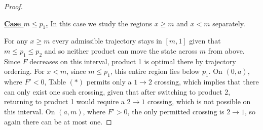 \documentclass[11pt]{article}
\begin{document}
\begin{proof}
\begin{figure}[H]
\centering
{}
\label{fig:middle-interval-policy}
\end{figure}

\medskip\noindent\underline{\textbf{\boldmath Case $m\le p_1$.}}
In this case we study the regions $x\ge m$ and $x<m$ separately.


For any $x\ge m$ every admissible trajectory stays in $[m,1]$ given that $m\le p_1\le p_2$ and so neither product can move the state across $m$ from above. Since $F$ decreases on this interval, product 1 is optimal there by trajectory ordering.
For $x<m$, since $m\le p_1$, this entire region lies below $p_1$. On $(0,a)$, where $F'<0$, Table $(*)$ permits only a $1\to2$ crossing, which implies that there can only exist one such crossing, given that after switching to product 2, returning to product 1 would require a $2\to1$ crossing, which is not possible on this interval. On $(a,m)$, where $F'>0$, the only permitted crossing is $2\to1$, so again there can be at most one.


\end{proof}
\end{document}
